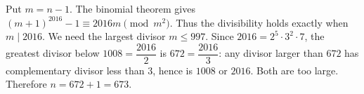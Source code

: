 Put $m=n-1$. The binomial theorem gives $(m+1)^{2016}-1\equiv2016m\pmod{m^2}$. Thus the divisibility holds exactly when $m\mid2016$. We need the largest divisor $m\le997$. Since $2016=2^5\cdot3^2\cdot7$, the greatest divisor below $1008=\dfrac{2016}{2}$ is $672=\dfrac{2016}{3}$: any divisor larger than $672$ has complementary divisor less than $3$, hence is $1008$ or $2016$. Both are too large. Therefore $n=672+1=\boxed{673}$.
